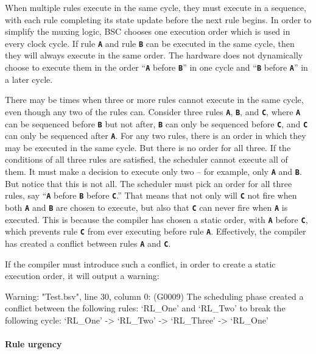 \documentclass{article}
\newenvironment{centerboxverbatim}
  {\center
   \boxedverbatim}
  {\endboxedverbatim
  {\endcenter }}
\begin{document}
When multiple rules execute in the same cycle, they must execute in a
sequence, with each rule completing its state update before the next
rule begins.  In order to simplify the muxing logic,
BSC chooses one execution order which is used in every clock
cycle.  If rule {\bf\tt A} and rule {\bf\tt B} can be executed in the
same cycle, then they will always execute in the same order.  The
hardware does not dynamically choose to execute them in the order
``{\bf\tt A} before {\bf\tt B}'' in one cycle and ``{\bf\tt B} before
{\bf\tt A}'' in a later cycle.

There may be times when three or more rules cannot execute in
the same cycle, even though any two of the rules can.  Consider three
rules {\bf\tt A}, {\bf\tt B}, and {\bf\tt C}, where {\bf\tt A} can be
sequenced before {\bf\tt B} but not after, {\bf\tt B} can only be
sequenced before {\bf\tt C}, and {\bf\tt C} can only be sequenced
after {\bf\tt A}.  For any two rules, there is an order in which they
may be executed in the same cycle.  But there is no order for all
three.  If the conditions of all three rules are satisfied, the
scheduler cannot execute all of them.  It must make a decision to execute
only two -- for example, only {\bf\tt A} and {\bf\tt B}.  But notice
that this is not all.  The scheduler must pick an order for all three
rules, say ``{\bf\tt A} before {\bf\tt B} before {\bf\tt C}.''  That
means that not only will {\bf\tt C} not fire when both {\bf\tt A} and
{\bf\tt B} are chosen to execute, but also that {\bf\tt C} can never
fire when {\bf\tt A} is executed.  This is because the compiler has
chosen a static order, with {\bf\tt A} before {\bf\tt C}, which
prevents rule {\bf\tt C} from ever executing before rule {\bf\tt A}.
Effectively, the compiler has created a conflict between rules
{\bf\tt A} and {\bf\tt C}.

If the compiler must introduce such a conflict, in order to create
a static execution order, it will output a warning:

\begin{centerboxverbatim}
Warning: "Test.bsv", line 30, column 0: (G0009)
  The scheduling phase created a conflict between the following rules:
      `RL_One' and `RL_Two'
  to break the following cycle:
      `RL_One' -> `RL_Two' -> `RL_Three' -> `RL_One'
\end{centerboxverbatim}

\paragraph{Rule urgency}
\end{document}
